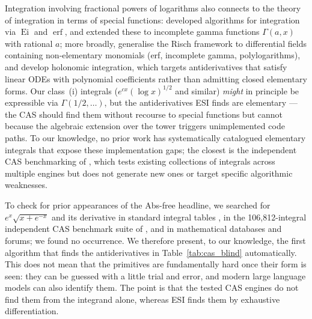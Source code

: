 \documentclass[preprint,12pt,authoryear]{elsarticle}
\newcommand{\codexadd}[1]{{\color{purple}#1}}
\newcommand{\hd}[1]{{\color{red}\textbf{[HD: #1]}}}
\begin{document}
Integration involving fractional powers of logarithms also connects to the theory of integration in terms of special functions: \citet{Cherry1985,Cherry1986} developed algorithms for integration via $\operatorname{Ei}$ and $\operatorname{erf}$, and \citet{Hebisch2018} extended these to incomplete gamma functions $\Gamma(a, x)$ with rational $a$; more broadly, \citet{Raab2012,Raab2013} generalise the Risch framework to differential fields containing non-elementary monomials (\textrm{erf}, incomplete gamma, polylogarithms), and \citet{KauersKoutschan2015,Koutschan2013} develop holonomic
integration, which targets antiderivatives that satisfy linear ODEs with polynomial coefficients rather than admitting closed elementary forms. Our class~(i) integrals ($e^{cx} (\log x)^{1/2}$ and similar) \emph{might} in principle be expressible via $\Gamma(1/2, \ldots)$, but the antiderivatives ESI finds are elementary --- the CAS should find them without recourse to special functions but cannot because the algebraic extension over the tower triggers unimplemented code paths. To our knowledge, no prior work has systematically catalogued elementary integrals that expose these implementation gaps; the closest is the independent CAS benchmarking of \citet{Nasser2024}, which tests existing collections of integrals across multiple engines but does not generate new ones or target specific algorithmic weaknesses.

To check for prior appearances of the Abs-free headline, we searched for $e^x\sqrt{x + e^{-x}}$ and its derivative in standard integral tables \citep{GradshteynRyzhik2015,Prudnikov1986,DLMF}, in the 106{,}812-integral independent CAS benchmark suite of \citet{Nasser2024}, and in mathematical databases and forums; we found no occurrence.
\codexadd{We therefore present, to our knowledge, the first algorithm that finds the antiderivatives in Table~\ref{tab:cas_blind} automatically. This does not mean that the primitives are fundamentally hard once their form is seen: they can be guessed with a little trial and error, and modern large language models can also identify them. The point is that the tested CAS engines do not find them from the integrand alone, whereas ESI finds them by exhaustive differentiation.}
\end{document}
